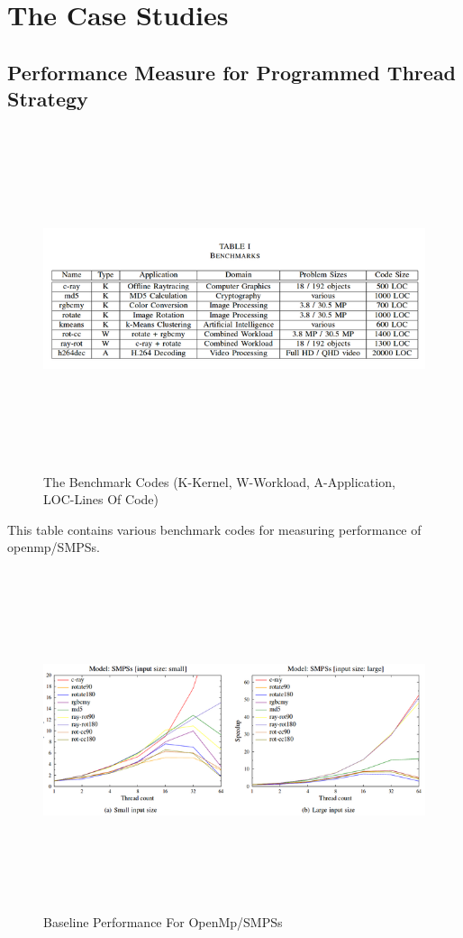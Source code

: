 \documentclass[a4paper,12pt]{article}
\begin{document}
\section{The Case Studies}
\subsection{Performance Measure for Programmed Thread Strategy}
\begin{figure}[H]
  \includegraphics[width=\textwidth,height=10cm]{benchmark.png}
  \caption{The Benchmark Codes (K-Kernel, W-Workload, A-Application, LOC-Lines Of Code)}
  \label{fig:benchmark}
\end{figure}

This table contains various benchmark codes for measuring performance of openmp/SMPSs.
\\ 
\begin{figure}[H]
  \includegraphics[width=\textwidth,height=10cm]{mpenthreads.png}
  \caption{Baseline Performance For OpenMp/SMPSs }
  \label{fig:openmp}
\end{figure}
\end{document}
